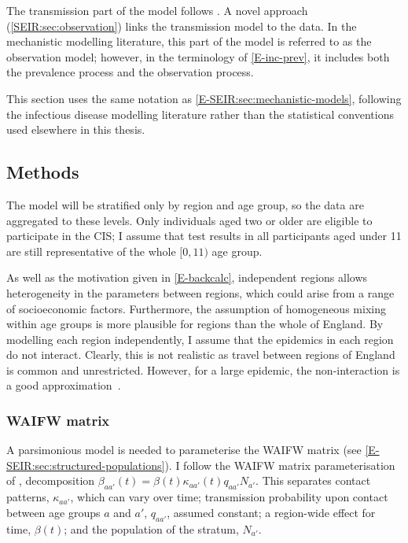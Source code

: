 \documentclass[thesis.tex]{subfiles}
\begin{document}
The transmission part of the model follows \textcite{birrellRealtime}.
A novel approach (\cref{SEIR:sec:observation}) links the transmission model to the data.
In the mechanistic modelling literature, this part of the model is referred to as the observation model; however, in the terminology of \cref{E-inc-prev}, it includes both the prevalence process and the observation process.

This section uses the same notation as \cref{E-SEIR:sec:mechanistic-models}, following the infectious disease modelling literature rather than the statistical conventions used elsewhere in this thesis.

\subsection{Methods}
The model will be stratified only by region and age group, so the data are aggregated to these levels.
Only individuals aged two or older are eligible to participate in the CIS; I assume that test results in all participants aged under 11 are still representative of the whole $[0, 11)$ age group.

As well as the motivation given in \cref{E-backcalc}, independent regions allows heterogeneity in the parameters between regions, which could arise from a range of socioeconomic factors.
Furthermore, the assumption of homogeneous mixing within age groups is more plausible for regions than the whole of England.
By modelling each region independently, I assume that the epidemics in each region do not interact.
Clearly, this is not realistic as travel between regions of England is common and unrestricted.
However, for a large epidemic, the non-interaction is a good approximation~\autocite{birrellRealtimea}.

\subsubsection{WAIFW matrix}

A parsimonious model is needed to parameterise the WAIFW matrix (see \cref{E-SEIR:sec:structured-populations}).
I follow the WAIFW matrix parameterisation of \textcite{birrellRealtime}, decomposition $\beta_{aa'}(t) = \beta(t) \kappa_{aa'}(t) q_{aa'} N_{a'}$.
This separates contact patterns, $\kappa_{aa'}$, which can vary over time; transmission probability upon contact between age groups $a$ and $a'$, $q_{aa'}$, assumed constant; a region-wide effect for time, $\beta(t)$; and the population of the stratum, $N_{a'}$.
\end{document}

